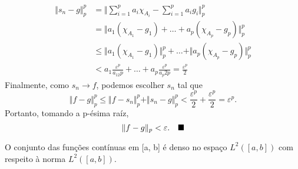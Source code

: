 \documentclass[MeasureTheory/measure_theory.tex]{subfiles}
\begin{document}
\begin{proof*}
\begin{align*}
		\Vert s_{n}-g \Vert_{p}^{p} & = \biggl\Vert \sum\limits_{i=1}^{p}a_{i}\chi_{A_{i}}-\sum\limits_{i=1}^{p}a_{i}g_{i} \biggr\Vert_{p}^{p}     \\
		                            & = \Vert a_1(\chi_{A_1}-g_1) + \dotsc + a_{p}(\chi_{A_p} - g_p) \Vert_{p}^{p}                                 \\
		                            & \leq \Vert a_1(\chi_{A_1}-g_1) \Vert_{p}^{p} + \dotsc + \Vert a_p(\chi_{A_p}-g_p) \Vert_{p}^{p}              \\
		                            & < a_1\frac{\varepsilon ^{p}}{a_12p} + \dotsc + a_p\frac{\varepsilon ^{p}}{a_p2p} = \frac{\varepsilon^{p}}{2}
	\end{align*}
	Finalmente, como \(s_{n}\to f\), podemos escolher \(s_{n}\) tal que
	\[
		\Vert f-g \Vert_{p}^{p}\leq \Vert f-s_{n} \Vert_{p}^{p}+\Vert s_{n}-g \Vert_{p}^{p}<\frac{\varepsilon ^{p}}{2}+\frac{\varepsilon^{p}}{2} = \varepsilon^{p}.
	\]
	Portanto, tomando a p-ésima raíz,
	\[
		\Vert f-g \Vert_{p} < \varepsilon .\quad \text{$\blacksquare$}
	\]

	\begin{crl*}
		O conjunto das funções contínuas em [a, b] é denso no espaço \(L^{2}([a, b])\) com respeito à norma \(L^{2}([a, b])\).
	\end{crl*}

\end{proof*}
\end{document}
